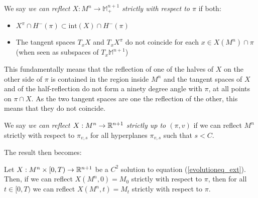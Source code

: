 \begin{defin}
	We say {\em we can reflect $X: M^n\rightarrow \mathbb{M}^{n+1}_+$ strictly with respect to $\pi$} if both:
	\begin{itemize}
		\item $X^\pi\cap H^-(\pi)\subset \mathrm{int}(X)\cap H^-(\pi)$ 
		\item The tangent spaces $T_xX$ and $T_xX^\pi$ do not coincide for each $x\in X(M^n) \cap \pi$ (when seen as subspaces of  $T_x\mathbb{M}^{n+1}$)
	\end{itemize} 
\end{defin}
This fundamentally means that the reflection of one of the halves of $X$ on the other side of $\pi$ is contained in the region inside $M^n$ and the tangent spaces of $X$ and of the half-reflection do not form a ninety degree angle with $\pi$, at all points on $\pi\cap X$. As the two tangent spaces are one the reflection of the other, this means that they do not coincide.   
\begin{defin}
	We say {\em we can reflect $X: M^n\rightarrow \mathbb{R}^{n+1}$ strictly up to $(\pi,v)$} if we can reflect $M^n$ strictly with respect to $\pi_{v, s}$ for all hyperplanes $\pi_{v, s}$ such that $s<C$.  
\end{defin}

The result then becomes:


\begin{theorem}\label{chow gulliver extended}
	Let $X:M^n\times [0,T) \rightarrow \mathbb{R}^{n+1}$ be a $C^2$ solution to equation (\ref{evolutioneq_ext}). Then, if we can reflect $X(M^n, 0)=M_0$ strictly with respect to $\pi$, then for all $t\in [0,T)$ we can reflect $X(M^n, t)=M_t$ strictly with respect to $\pi$. 
\end{theorem}


